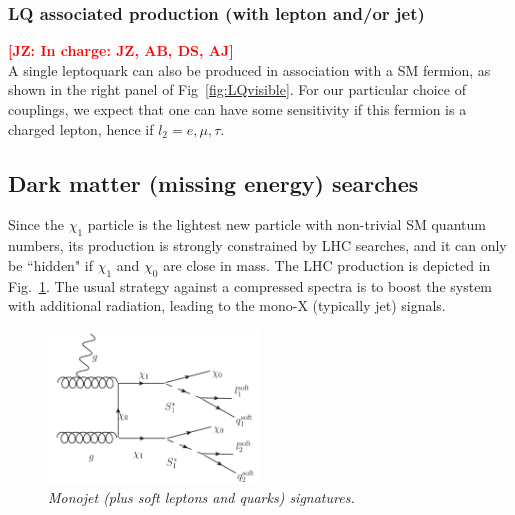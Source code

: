 \documentclass[11pt]{cernrep}
\def\JZ#1{{\bf  \textcolor{red}{[JZ: {#1}]}}}
\begin{document}
\subsubsection{LQ associated production (with lepton and/or jet)}
\JZ{In charge: JZ, AB, DS, AJ} \\
A single leptoquark can also be produced in association with a SM fermion, as shown in the right panel of Fig~\ref{fig:LQvisible}. For our particular choice of couplings, we expect that one can have some sensitivity if this fermion is a charged lepton, hence if $l_2=e, \mu, \tau$.


\subsection{Dark matter (missing energy) searches}
\label{subsec:mjet}
Since the $\chi_1$ particle is the lightest new particle with non-trivial SM quantum numbers, its production is strongly constrained by LHC searches, and it can only be ``hidden" if $\chi_1$ and $\chi_0$ are close in mass. The LHC production is depicted in Fig.~\ref{fig:MonoJet}. The usual strategy against a compressed spectra is to boost the system with additional radiation, leading to the mono-X (typically jet) signals. 

 \begin{figure}[!htp]
  \centering
  \includegraphics[width=0.5\textwidth]{./figures/MonoJet.png} 
  \caption{\it Monojet (plus soft leptons and quarks) signatures.}
\label{fig:MonoJet}
\end{figure}
\end{document}
